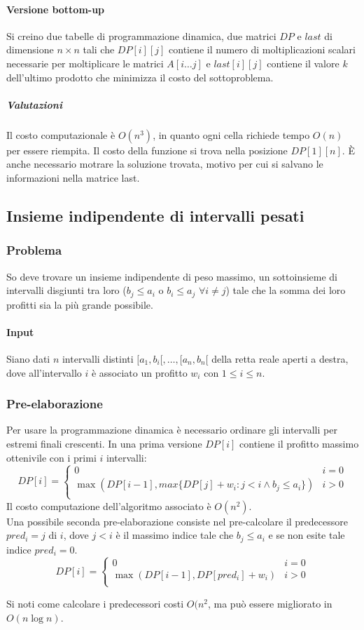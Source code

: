 \paragraph{Versione bottom-up}
Si creino due tabelle di programmazione dinamica, due matrici $DP$ e $last$ di dimensione $n\times n$ tali che $DP[i][j]$ contiene il numero di moltiplicazioni scalari necessarie per 
moltiplicare le matrici $A[i\dots j]$ e $last[i][j]$ contiene il valore $k$ dell'ultimo prodotto che minimizza il costo del sottoproblema.

\subparagraph{Valutazioni}
Il costo computazionale \`e $O(n^3)$, in quanto ogni cella richiede tempo $O(n)$ per essere riempita. Il costo della funzione si trova nella posizione $DP[1][n]$. \`E anche necessario
motrare la soluzione trovata, motivo per cui si salvano le informazioni nella matrice last. 



\subsection{Insieme indipendente di intervalli pesati}
\subsubsection{Problema}
So deve trovare un insieme indipendente di peso massimo, un sottoinsieme di intervalli disgiunti tra loro ($b_j \le a_i$ o $b_i\le a_j$ $\forall i\neq j$) tale che la somma dei loro 
profitti sia la pi\`u grande possibile.
\paragraph{Input}
Siano dati $n$ intervalli distinti $[a_1, b_i[, \dots, [a_n, b_n[$ della retta reale aperti a destra, dove all'intervallo $i$ \`e associato un profitto $w_i$ con $1\le i\le n$.
\subsubsection{Pre-elaborazione}
Per usare la programmazione dinamica \`e necessario ordinare gli intervalli per estremi finali crescenti. In una prima versione $DP[i]$ contiene il profitto massimo ottenivile con i
primi $i$ intervalli:
$$DP[i] =\begin{cases}
	0 & i = 0\\
	\max(DP[i-1], max\{DP[j]+w_i: j < i \land b_j\le a_i\}) & i >0\\
\end{cases}$$
Il costo computazione dell'algoritmo associato \`e $O(n^2)$.\\
Una possibile seconda pre-elaborazione consiste nel pre-calcolare il predecessore $pred_i = j$ di $i$, dove $j < i$ \`e il massimo indice tale che $b_j\le a_i$ e se non esite tale 
indice $pred_i = 0$. 
$$DP[i] = \begin{cases}
	0 & i = 0\\
	\max(DP[i-1], DP[pred_i]+w_i) & i > 0\\
\end{cases}$$

Si noti come calcolare i predecessori costi $O(n^2$, ma pu\`o essere migliorato in $O(n\log n)$. 
